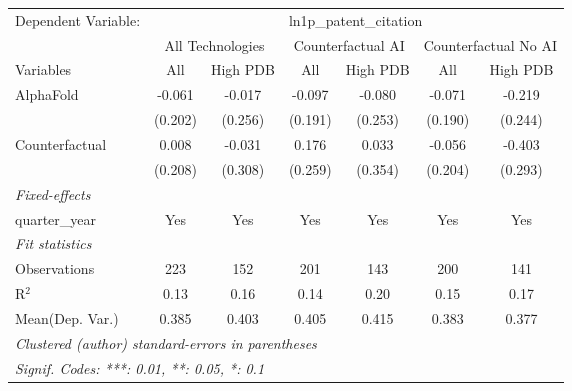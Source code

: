\begingroup
\centering
\begin{tabular}{lcccccc}
   \tabularnewline \midrule \midrule
   Dependent Variable: & \multicolumn{6}{c}{ln1p\_patent\_citation}\\
 & \multicolumn{2}{c}{All Technologies} & \multicolumn{2}{c}{Counterfactual AI} & \multicolumn{2}{c}{Counterfactual No AI} \\
\cmidrule(lr){1-1}\cmidrule(lr){2-3} \cmidrule(lr){4-5} \cmidrule(lr){6-7}
Variables & \multicolumn{1}{c}{All} & \multicolumn{1}{c}{High PDB} & \multicolumn{1}{c}{All} & \multicolumn{1}{c}{High PDB} & \multicolumn{1}{c}{All} & \multicolumn{1}{c}{High PDB} \\
\cmidrule(lr){1-1}\cmidrule(lr){2-2} \cmidrule(lr){3-3} \cmidrule(lr){4-4} \cmidrule(lr){5-5} \cmidrule(lr){6-6} \cmidrule(lr){7-7}
   AlphaFold      & -0.061  & -0.017  & -0.097  & -0.080  & -0.071  & -0.219\\   
                  & (0.202) & (0.256) & (0.191) & (0.253) & (0.190) & (0.244)\\   
   Counterfactual & 0.008   & -0.031  & 0.176   & 0.033   & -0.056  & -0.403\\   
                  & (0.208) & (0.308) & (0.259) & (0.354) & (0.204) & (0.293)\\   
   \midrule
   \emph{Fixed-effects}\\
   quarter\_year  & Yes     & Yes     & Yes     & Yes     & Yes     & Yes\\  
   \midrule
   \emph{Fit statistics}\\
   Observations   & 223     & 152     & 201     & 143     & 200     & 141\\  
   R$^2$          & 0.13    & 0.16    & 0.14    & 0.20    & 0.15    & 0.17\\  
Mean(Dep. Var.) & 0.385 & 0.403 & 0.405 & 0.415 & 0.383 & 0.377 \\
   \midrule \midrule
   \multicolumn{7}{l}{\emph{Clustered (author) standard-errors in parentheses}}\\
   \multicolumn{7}{l}{\emph{Signif. Codes: ***: 0.01, **: 0.05, *: 0.1}}\\
\end{tabular}
\par\endgroup
